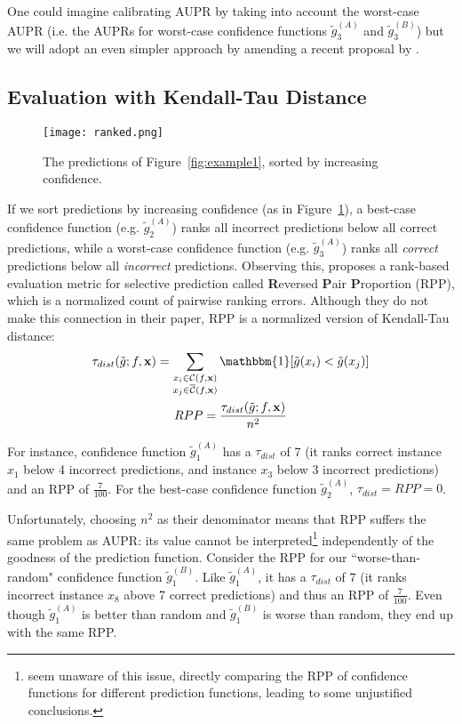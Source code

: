 \documentclass[11pt]{article}
\begin{document}
One could imagine calibrating AUPR by taking into account the worst-case AUPR (i.e. the AUPRs for worst-case confidence functions $\tilde{g}_3^{(A)}$ and $\tilde{g}_3^{(B)}$) but we will adopt an even simpler approach by amending a recent proposal by \cite{xin-etal-2021-art}.

\subsection{Evaluation with Kendall-Tau Distance}

\begin{figure}
\centering
\texttt{[image: ranked.png]}
\caption{The predictions of Figure~\ref{fig:example1}, sorted by increasing confidence.}
\label{fig:ranked}
\end{figure}


If we sort predictions by increasing confidence (as in Figure~\ref{fig:ranked}), a best-case confidence function (e.g. $\tilde{g}_2^{(A)}$) ranks all incorrect predictions below all correct predictions, while a worst-case confidence function (e.g. $\tilde{g}_3^{(A)}$) ranks all \emph{correct} predictions below all \emph{incorrect} predictions. Observing this, \cite{xin-etal-2021-art} proposes a rank-based evaluation metric for selective prediction called \textbf{R}eversed \textbf{P}air \textbf{P}roportion (RPP), which is a normalized count of pairwise ranking errors. Although they do not make this connection in their paper, RPP is a normalized version of Kendall-Tau distance: 
\begin{gather*}
\tau_{dist}(\tilde{g} ; f, \mathbf{x}) = \sum_{\substack{
x_i \in \mathcal{C}(f, \mathbf{x})\\
x_j \in \overline{\mathcal{C}}(f, \mathbf{x})}} \mathbbm{1}[\tilde{g}(x_i) < \tilde{g}(x_j)] \\
RPP = \frac{\tau_{dist}(\tilde{g} ; f, \mathbf{x})}{n^2}
\end{gather*}

For instance, confidence function $\tilde{g}_1^{(A)}$ has a $\tau_{dist}$ of 7 (it ranks correct instance $x_1$ below 4 incorrect predictions, and instance $x_3$ below 3 incorrect predictions) and an RPP of $\frac{7}{100}$. For the best-case confidence function $\tilde{g}_2^{(A)}$, $\tau_{dist} = RPP = 0$. 

Unfortunately, choosing $n^2$ as their denominator means that RPP suffers the same problem as AUPR: its value cannot be interpreted\footnote{\cite{xin-etal-2021-art} seem unaware of this issue, directly comparing the RPP of confidence functions for different prediction functions, leading to some unjustified conclusions.} independently of the goodness of the prediction function. Consider the RPP for our ``worse-than-random" confidence function $\tilde{g}_1^{(B)}$. Like $\tilde{g}_1^{(A)}$, it has a $\tau_{dist}$ of 7 (it ranks incorrect instance $x_8$ above 7 correct predictions) and thus an RPP of $\frac{7}{100}$. Even though $\tilde{g}_1^{(A)}$ is better than random and $\tilde{g}_1^{(B)}$ is worse than random, they end up with the same RPP. 
\end{document}
